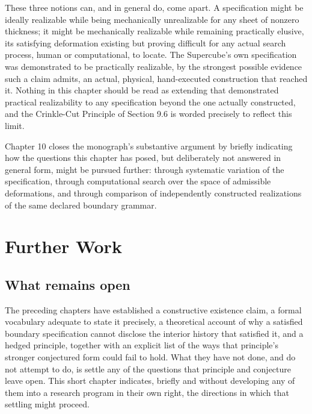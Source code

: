 \documentclass[11pt,oneside]{book}
\begin{document}
These three notions can, and in general do, come apart. A specification
might be ideally realizable while being mechanically unrealizable for
any sheet of nonzero thickness; it might be mechanically realizable
while remaining practically elusive, its satisfying deformation existing
but proving difficult for any actual search process, human or
computational, to locate. The Supercube's own specification was
demonstrated to be practically realizable, by the strongest possible
evidence such a claim admits, an actual, physical, hand-executed
construction that reached it. Nothing in this chapter should be read as
extending that demonstrated practical realizability to any specification
beyond the one actually constructed, and the Crinkle-Cut Principle of
Section 9.6 is worded precisely to reflect this limit.

Chapter 10 closes the monograph's substantive argument by briefly
indicating how the questions this chapter has posed, but deliberately
not answered in general form, might be pursued further: through
systematic variation of the specification, through computational search
over the space of admissible deformations, and through comparison of
independently constructed realizations of the same declared boundary
grammar.

\hypertarget{chapter-10.-further-work}{%
\chapter{Further Work}\label{chapter-10.-further-work}}

\hypertarget{what-remains-open}{%
\section{What remains open}\label{what-remains-open}}

The preceding chapters have established a constructive existence claim,
a formal vocabulary adequate to state it precisely, a theoretical
account of why a satisfied boundary specification cannot disclose the
interior history that satisfied it, and a hedged principle, together
with an explicit list of the ways that principle's stronger conjectured
form could fail to hold. What they have not done, and do not attempt to
do, is settle any of the questions that principle and conjecture leave
open. This short chapter indicates, briefly and without developing any
of them into a research program in their own right, the directions in
which that settling might proceed.
\end{document}
